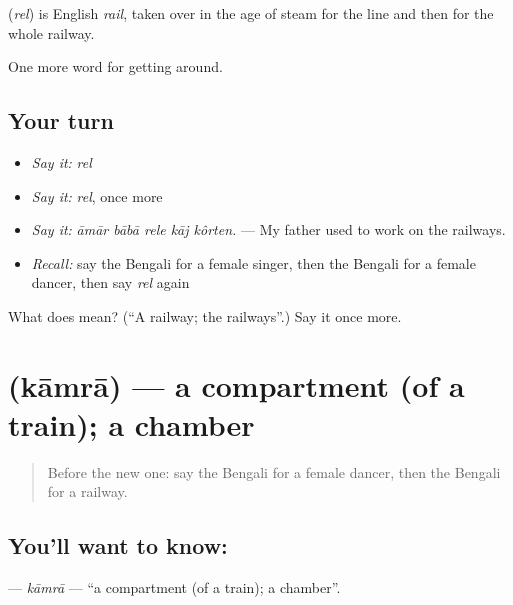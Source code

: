 \begin{cousinweb}
\textbf{} (\emph{rel}) is English \emph{rail}, taken over in the age of steam for the line and then for the whole railway.
\end{cousinweb}

\begin{grammarlens}[title={What you've built}]
One more word for getting around.
\end{grammarlens}

\subsection*{Your turn}
\begin{itemize}
\raggedright
  \item \emph{Say it:} \emph{rel}
  \item \emph{Say it:} \emph{rel}, once more
  \item \emph{Say it:} \emph{āmār bābā rele kāj kôrten.} — My father used to work on the railways.
  \item \emph{Recall:} say the Bengali for a female singer, then the Bengali for a female dancer, then say \emph{rel} again
\end{itemize}

\begin{tcolorbox}[breakable,colback=teal!4,colframe=teal!35!black,title={Before you move on}]
What does  mean? (\textquotedblleft{}A railway; the railways\textquotedblright{}.) Say it once more.
\end{tcolorbox}
\section[\texorpdfstring{\bn{কামরা} (kāmrā)}{কামরা (kāmrā)}]{ (kāmrā) — a compartment (of a train); a chamber}

\label{lesson:BN-C384-kamra}



\begin{quote}
Before the new one: say the Bengali for a female dancer, then the Bengali for a railway.
\end{quote}

\subsection*{You'll want to know: }
\textbf{} — \emph{kāmrā} — \textquotedblleft{}a compartment (of a train); a chamber\textquotedblright{}.

